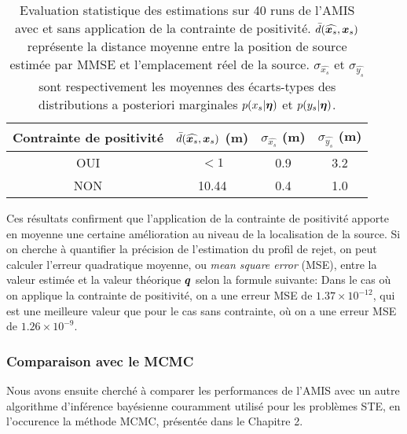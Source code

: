 {\begin{table}[h!]
    	\begin{tabular}{cccc}
    		
    		Contrainte de positivité & $\bar{d}(\widehat{{\bm{x}_s}},{\bm{x}_s})$ (m)& $\sigma_{\widehat{x_s}}$ (m)& $\sigma_{\widehat{y_s}}$ (m)\\
    		\hline
    		OUI                   & {$<1$}  	& 0.9        & 3.2        \\
    		NON                   & 10.44   & 0.4        & 1.0 \\      
    		\hline
    	\end{tabular}
    	\caption{Evaluation statistique des estimations sur 40 runs de l'AMIS avec et sans application de la contrainte de positivité. $\bar{d}(\widehat{{\bm{x}_s}},{\bm{x}_s})$ représente la distance moyenne entre la position de source estimée par MMSE et l'emplacement réel de la source. $\sigma_{\widehat{x_s}}$ et $\sigma_{\widehat{y_s}}$ sont respectivement les moyennes des écarts-types des distributions a posteriori marginales $p(x_s | {\bm{\eta}})$ et $p(y_s | {\bm{\eta}})$. }
    	\label{table_1_AE}
    \end{table}
    
    Ces résultats confirment que l'application de la contrainte de positivité apporte en moyenne une certaine amélioration au niveau de la localisation de la source. Si on cherche à quantifier la précision de l'estimation du profil de rejet, on peut calculer l'erreur quadratique moyenne, ou \textit{mean square error} (MSE), entre la valeur estimée \NdFS{$\widehat{\VecQSource}$} et la valeur théorique ${\bm{q}}$ selon la formule suivante: 
Dans le cas où on applique la contrainte de positivité, on a une erreur MSE de $1.37\times10^{-12}$, qui est une meilleure valeur que pour le cas sans contrainte, où on a une erreur MSE de $1.26\times10^{-9}$.  \\

\subsubsection{Comparaison avec le MCMC}

Nous avons ensuite cherché à comparer les performances de l'AMIS avec un autre algorithme d'inférence bayésienne couramment utilisé pour les problèmes STE, en l'occurence la méthode MCMC, présentée dans le Chapitre 2. \\

}
